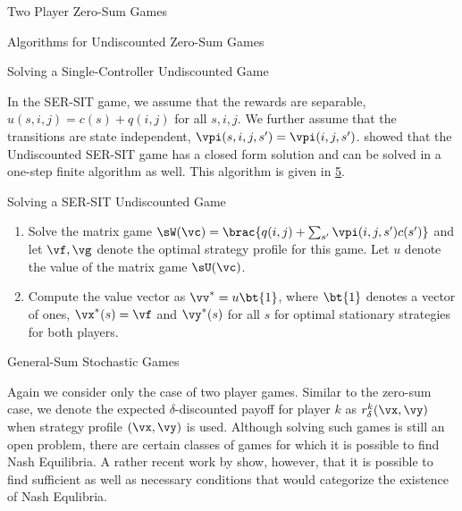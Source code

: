 \documentclass{article}
\begin{document}
\begin{psection}{Two Player Zero-Sum Games}
\begin{psubsection}{Algorithms for Undiscounted Zero-Sum Games}
\begin{algo}[0.9\textwidth]{Solving a Single-Controller Undiscounted Game}
		\end{algo}


		In the SER-SIT game, we assume that the rewards are separable, \ie $u(s, i, j) = c(s) + q(i, j)$ for all $s, i, j$. We further assume that the transitions are state independent, \ie $\vpi(s, i, j, s') = \vpi(i, j, s')$. \cite{parthasarathy} showed that the Undiscounted SER-SIT game has a closed form solution and can be solved in a one-step finite algorithm as well. This algorithm is given in \hyperlink{algo:5}{5}.

		\begin{algo}[0.9\textwidth]{Solving a SER-SIT Undiscounted Game}

			\begin{enumerate}
				\item Solve the matrix game $\sW(\vc) = \brac{q(i, j) + \sum_{s'} \vpi(i, j, s') c(s')}$ and let $\vf, \vg$ denote the optimal strategy profile for this game. Let $u$ denote the value of the matrix game $\sU(\vc)$.
				\item Compute the value vector as $\vv^\ast = u \bt{1}$, where $\bt{1}$ denotes a vector of ones, $\vx^\ast(s) = \vf$ and $\vy^\ast(s)$ for all $s$ for optimal stationary strategies for both players.
			\end{enumerate}

		\end{algo}

	\end{psubsection}

	\begin{psubsection}{General-Sum Stochastic Games}

		Again we consider only the case of two player games. Similar to the zero-sum case, we denote the expected $\delta$-discounted payoff for player $k$ as $r_\delta^k(\vx, \vy)$ when strategy profile $(\vx, \vy)$ is used. Although solving such games is still an open problem, there are certain classes of games for which it is possible to find Nash Equilibria. A rather recent work by \cite{gensum} show, however, that it is possible to find sufficient as well as necessary conditions that would categorize the existence of Nash Equlibria.


\end{psubsection}
\end{psection}
\end{document}
